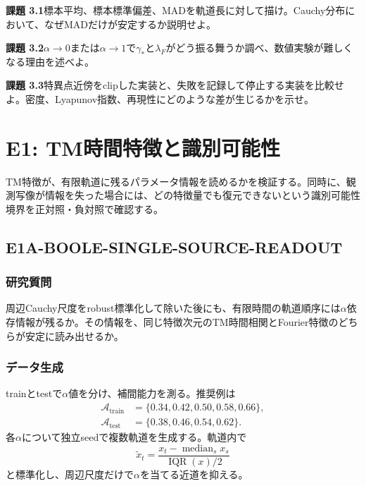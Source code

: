 \documentclass[a4paper,11pt,oneside,openany]{ltjsbook}
\newcommand{\median}{\operatorname{median}}
\newcommand{\IQR}{\operatorname{IQR}}
\begin{document}
\begin{taskbox}
\textbf{課題 3.1}\quad 標本平均、標本標準偏差、MADを軌道長に対して描け。Cauchy分布において、なぜMADだけが安定するか説明せよ。

\medskip
\textbf{課題 3.2}\quad \(\alpha\to0\)または\(\alpha\to1\)で\(\gamma_*\)と\(\lambda_F\)がどう振る舞うか調べ、数値実験が難しくなる理由を述べよ。

\medskip
\textbf{課題 3.3}\quad 特異点近傍をclipした実装と、失敗を記録して停止する実装を比較せよ。密度、Lyapunov指数、再現性にどのような差が生じるかを示せ。
\end{taskbox}

\chapter{E1: TM時間特徴と識別可能性}
\label{chap:e1}

\begin{purposebox}
TM特徴が、有限軌道に残るパラメータ情報を読めるかを検証する。同時に、観測写像が情報を失った場合には、どの特徴量でも復元できないという識別可能性境界を正対照・負対照で確認する。
\end{purposebox}

\section{E1A-BOOLE-SINGLE-SOURCE-READOUT}

\subsection{研究質問}

周辺Cauchy尺度をrobust標準化して除いた後にも、有限時間の軌道順序には\(\alpha\)依存情報が残るか。その情報を、同じ特徴次元のTM時間相関とFourier特徴のどちらが安定に読み出せるか。

\subsection{データ生成}

trainとtestで\(\alpha\)値を分け、補間能力を測る。推奨例は
\begin{align}
  \mathcal A_{\mathrm{train}}
  &=\{0.34,0.42,0.50,0.58,0.66\},\\
  \mathcal A_{\mathrm{test}}
  &=\{0.38,0.46,0.54,0.62\}.
  \label{eq:e1_alpha_split}
\end{align}
各\(\alpha\)について独立seedで複数軌道を生成する。軌道内で
\begin{equation}
  \widetilde x_t
  =\frac{x_t-\median_s x_s}{\IQR(x)/2}
  \label{eq:robust_orbit_standardization}
\end{equation}
と標準化し、周辺尺度だけで\(\alpha\)を当てる近道を抑える。
\end{document}
